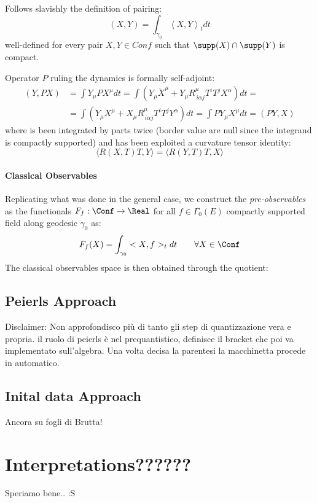 \documentclass[Main]{subfiles}
\begin{document}
				Follows slavishly the definition of pairing:
				\begin{equation}
					\left( X, Y \right) = \int_{\gamma_0} \left\langle X,Y \right\rangle_t dt
				\end{equation}
				well-defined for every pair $X,Y \in Conf$ such that $\supp(X) \cap \supp(Y)$ is compact.
				
				Operator $P$ ruling the dynamics is formally self-adjoint:
				\begin{align*}
				 ( Y, PX) &= \int Y_\mu PX^\mu dt= 
				 \int\left( Y_\mu \ddot{X}^\mu + Y_\mu R^\mu_{\, i \alpha j}T^i T^j X^\alpha \right)dt = \\
 				 &= \int\left( \ddot{Y}_\mu X^\mu + X_\mu R^\mu_{\, i \alpha j}T^i T^j Y^\alpha \right)dt =
				 \int P Y_\mu X^\mu dt=( PY, X) 				 				 
				\end{align*}
				where is been integrated by parts twice (border value are null since the integrand is compactly supported) and has been exploited a curvature tensor identity:
				\begin{displaymath}
					\langle R(X,T)T,Y \rangle = \langle R(Y,T)T,X \rangle
				\end{displaymath}

			\paragraph{Classical Observables}
				Replicating what was done in the general case, 
				we construct the \emph{pre-observables} as the functionals $F_f:\Conf \rightarrow \Real$ for all $f \in \Gamma_0(E)$ compactly supported field along geodesic $\gamma_0$ as:
				\begin{equation}
					F_f(X) = \int_{\gamma_0} <X, f>_t dt \qquad \forall X \in \Conf
				\end{equation}
				The classical observables space is then obtained through the quotient:


\subsection{Peierls Approach}
	\begin{Warning}
		Disclaimer: Non approfondisco più di tanto gli step di quantizzazione vera e propria. il ruolo di peierls è nel prequantistico, definisce il bracket che poi va implementato sull'algebra. Una volta decisa la parentesi la macchinetta procede in automatico.
	\end{Warning}

\subsection{Inital data Approach}
	\begin{Warning}
		Ancora su fogli di Brutta!
	\end{Warning}

\section{Interpretations??????}
	\begin{Warning}
		Speriamo bene.. :S
	\end{Warning}
\end{document}
